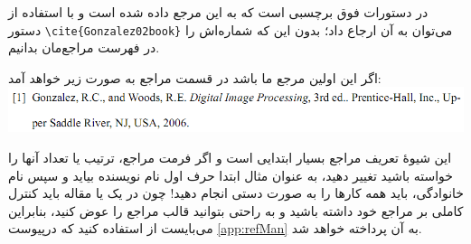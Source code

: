 در دستورات فوق   برچسبی است که به این مرجع داده شده است و با استفاده از دستور 
\verb!\cite{Gonzalez02book}!
می‌توان به آن ارجاع داد؛ بدون این که شماره‌اش را در فهرست مراجع‌مان بدانیم.

اگر این اولین مرجع ما باشد در قسمت مراجع به صورت زیر خواهد آمد:\\
\includegraphics[width=\textwidth]{gonzalez.png}

این شیوهٔ تعریف مراجع بسیار ابتدایی است و اگر فرمت مراجع، ترتیب یا تعداد آنها را خواسته باشید تغییر دهید، به عنوان مثال ابتدا حرف اول نام نویسنده بیاید و سپس نام خانوادگی، باید همه کارها را به صورت دستی انجام دهید!
چون در یک \پ یا مقاله باید کنترل کاملی بر مراجع خود داشته باشید و به راحتی بتوانید قالب مراجع را عوض کنید، بنابراین می‌بایست از  استفاده کنید که درپیوست  \ref{app:refMan} به  آن پرداخته خواهد شد.
